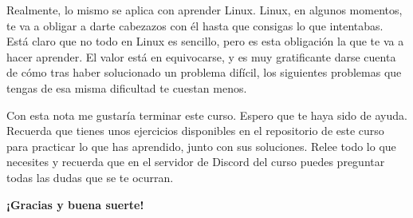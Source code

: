 Realmente, lo mismo se aplica con aprender Linux. Linux, en algunos momentos, te va a obligar a darte cabezazos con él hasta que consigas lo que intentabas. Está claro que no todo en Linux es sencillo, pero es esta obligación la que te va a hacer aprender. El valor está en equivocarse, y es muy gratificante darse cuenta de cómo tras haber solucionado un problema difícil, los siguientes problemas que tengas de esa misma dificultad te cuestan menos.

Con esta nota me gustaría terminar este curso. Espero que te haya sido de ayuda. Recuerda que tienes unos ejercicios disponibles en el repositorio de este curso para practicar lo que has aprendido, junto con sus soluciones. Relee todo lo que necesites y recuerda que en el servidor de Discord del curso puedes preguntar todas las dudas que se te ocurran.

\textbf{¡Gracias y buena suerte!}
